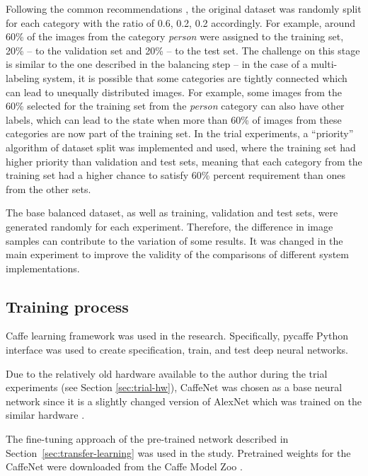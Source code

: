     Following the common recommendations \cite{Ng2016NutsLearning}, the original dataset was randomly split for each category with the ratio of 0.6, 0.2, 0.2 accordingly. For example, around 60\% of the images from the category \textit{person} were assigned to the training set, 20\% -- to the validation set and 20\% -- to the test set. The challenge on this stage is similar to the one described in the balancing step -- in the case of a multi-labeling system, it is possible that some categories are tightly connected which can lead to unequally distributed images. For example, some images from the 60\% selected for the training set from the \textit{person} category can also have other labels, which can lead to the state when more than 60\% of images from these categories are now part of the training set. In the trial experiments, a ``priority'' algorithm of dataset split was implemented and used, where the training set had higher priority than validation and test sets, meaning that each category from the training set had a higher chance to satisfy 60\% percent requirement than ones from the other sets.
    
    The base balanced dataset, as well as training, validation and test sets, were generated randomly for each experiment. Therefore, the difference in image samples can contribute to the variation of some results. It was changed in the main experiment to improve the validity of the comparisons of different system implementations.
    
    \subsection{Training process}
    \label{sec:trial-training}
    Caffe \cite{Caffe} learning framework was used in the research. Specifically, pycaffe \cite{pycaffe} Python interface was used to create specification, train, and test deep neural networks.
    
    Due to the relatively old hardware available to the author during the trial experiments (see Section \ref{sec:trial-hw}), CaffeNet \cite{CaffeNet} was chosen as a base neural network since it is a slightly changed version of AlexNet which was trained on the similar hardware \cite{Krizhevsky2012ImageNetDNN}.
    
    The fine-tuning approach of the pre-trained network described in Section~\ref{sec:transfer-learning} was used in the study. Pretrained weights for the CaffeNet were downloaded from the Caffe Model Zoo \cite{CaffeModelZoo}.
    
